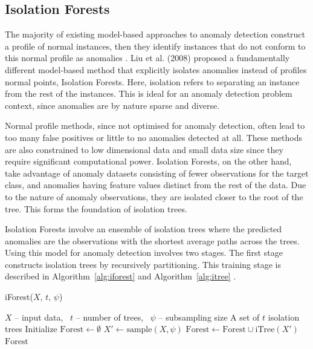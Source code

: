 \documentclass[10pt, conference]{IEEEtran}
\begin{document}
\subsection{Isolation Forests}
The majority of existing model-based approaches to anomaly detection construct a profile of normal instances, then they identify instances that do not conform to this normal profile as anomalies \cite{iforest}. Liu et al. (2008) proposed a fundamentally different model-based method that explicitly isolates anomalies instead of profiles normal points, Isolation Forests. Here, isolation refers to separating an instance from the rest of the instances. This is ideal for an anomaly detection problem context, since anomalies are by nature sparse and diverse.

Normal profile methods, since not optimised for anomaly detection, often lead to too many false positives or little to no anomalies detected at all. These methods are also constrained to low dimensional data and small data size since they require significant computational power. Isolation Forests, on the other hand, take advantage of anomaly datasets consisting of fewer observations for the target class, and anomalies having feature values distinct from the rest of the data. Due to the nature of anomaly observations, they are isolated closer to the root of the tree. This forms the foundation of isolation trees.

Isolation Forests involve an ensemble of isolation trees where the predicted anomalies are the observations with the shortest average paths across the trees. Using this model for anomaly detection involves two stages. The first stage constructs isolation trees by recursively partitioning. This training stage is described in Algorithm~\ref{alg:iforest} and Algorithm~\ref{alg:itree} \cite{iforest2}.

\begin{algorithm}[H]
	\caption{iForest($X$, $t$, $\psi$)}
	\label{alg:iforest}
	\begin{algorithmic}[1]
		\Require $X$ -- input data, \ $t$ -- number of trees, \ $\psi$ -- subsampling size
		\Ensure A set of $t$ isolation trees
		\State Initialize $\text{Forest} \gets \emptyset$
		\State $X' \gets \text{sample}(X, \psi)$
		\State $\text{Forest} \gets \text{Forest} \cup \text{iTree}(X')$
		\EndFor \\
		\Return $\text{Forest}$
	\end{algorithmic}
\end{algorithm}
\end{document}
